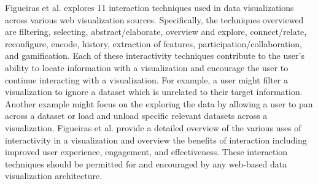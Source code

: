 Figueiras et al. explores 11 interaction techniques used in data visualizations across various web visualization sources.  Specifically, the techniques overviewed are filtering, selecting, abstract/elaborate, overview and explore, connect/relate, reconfigure, encode, history, extraction of features, participation/collaboration, and gamification. Each of these interactivity techniques contribute to the user’s ability to locate information with a visualization and encourage the user to continue interacting with a visualization.  For example, a user might filter a visualization to ignore a dataset which is unrelated to their target information.  Another example might focus on the exploring the data by allowing a user to pan across a dataset or load and unload specific relevant datasets across a visualization.  Figueiras et al. provide a detailed overview of the various uses of interactivity in a visualization and overview the benefits of interaction including improved user experience, engagement, and effectiveness.  These interaction techniques should be permitted for and encouraged by any web-based data visualization architecture. \par
